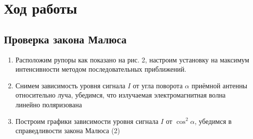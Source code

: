 \documentclass[a4paper]{article}
\begin{document}
\section{Ход работы}
\subsection{Проверка закона Малюса}
\begin{enumerate}
    \item Расположим рупоры как показано на рис. 2, настроим установку на максимум интенсивности методом последовательных приближений.
    \item Снимем зависимость уровня сигнала $I$ от угла поворота $\alpha$ приёмной антенны относительно луча, убедимся, что излучаемая электромагнитная волна линейно поляризована
    \item Построим графики зависимости уровня сигнала $I$ от $\cos^2 \alpha$, убедимся в справедливости закона Малюса (2)
    

\end{enumerate}
\end{document}
